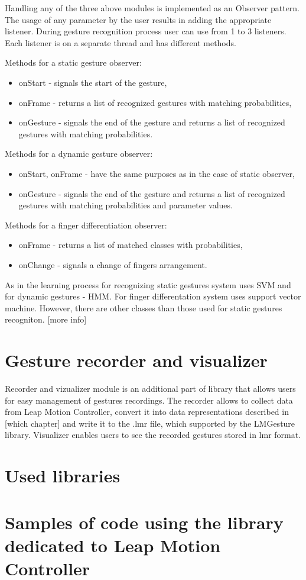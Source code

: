 Handling any of the three above modules is implemented as an Observer pattern. The usage of any parameter by the user results in adding the appropriate listener. During gesture recognition process user can use from 1 to 3 listeners. Each listener is on a separate thread and has different methods.

Methods for a static gesture observer:
\begin {itemize}
\item onStart - signals the start of the gesture,
\item onFrame - returns a list of recognized gestures with matching probabilities,
\item onGesture - signals the end of the gesture and returns a list of recognized gestures with matching probabilities.
\end {itemize}

Methods for a dynamic gesture observer:
\begin {itemize}
\item onStart, onFrame - have the same purposes as in the case of static observer,
\item onGesture - signals the end of the gesture and returns a list of recognized gestures with matching probabilities and parameter values.
\end {itemize}

Methods for a finger differentiation observer:
\begin {itemize}
\item onFrame - returns a list of matched classes with probabilities,
\item onChange - signals a change of fingers arrangement.
\end {itemize}

As in the learning process for recognizing static gestures system uses SVM and for dynamic gestures - HMM. For finger differentation system uses support vector machine. However, there are other classes than those used for static gestures recogniton. {\color{red}[more info]}

\section{Gesture recorder and visualizer}
Recorder and vizualizer module is an additional part of library that allows users for easy management of  gestures recordings. The recorder allows to collect data from Leap Motion Controller, convert it into data representations described in {\color{red}[which chapter]} and write it to the .lmr file, which supported by the LMGesture library. Visualizer enables users to see the recorded gestures stored in lmr format. 

\section{Used libraries}

\section{Samples of code using the library dedicated to Leap Motion Controller}
